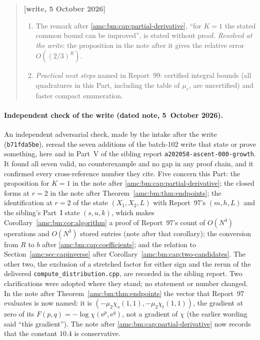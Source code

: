 \documentclass[11pt,letterpaper]{article}
\theoremstyle{remark}\newtheorem{remark}[theorem]{Remark}
\newcommand{\ee}{\mathrm e}
\newenvironment{writenotedated}[1]{\par\smallskip\begin{quote}\small\textbf{[write, #1]}\ }{\end{quote}\smallskip}
\newcommand{\repopath}[1]{\nolinkurl{#1}}
\begin{document}
\begin{writenotedated}{5 October 2026}
\begin{enumerate}
\item The remark after \eqref{amc:bm:cap:partial-derivative}, ``for $K=1$ the stated common bound can be improved'', is stated without proof. \emph{Resolved at the write}: the proposition in the note after it gives the relative error $O((2/3)^R)$.
\item \emph{Practical next steps} named in Report~99: certified integral bounds (all quadratures in this Part, including the table of $\mu_r$, are uncertified) and faster compact enumeration.
\end{enumerate}
\end{writenotedated}

\paragraph{Independent check of the write (dated note, 5~October 2026).}
An independent adversarial check, made by the intake after the write
(\texttt{b71fda5be}), reread the seven additions of the batch-102 write
that state or prove something, here and in Part~V of the sibling report
\repopath{a202058-ascent-000-growth}. It found all seven valid, no
counterexample and no gap in any proof chain, and it confirmed every
cross-reference number they cite. Five concern this Part: the proposition
for $K=1$ in the note after \eqref{amc:bm:cap:partial-derivative}; the
closed forms at $r=2$ in the note after
Theorem~\ref{amc:bm:thm:endpoints}; the identification at $r=2$ of the
state $(X_1,X_2,L)$ with Report~97's $(m,h,L)$ and the sibling's Part~I
state $(s,u,k)$, which makes Corollary~\ref{amc:bm:cor:algorithm} a proof
of Report~97's count of $O(N^4)$ operations and $O(N^3)$ stored entries
(note after that corollary); the conversion from $R$ to $b$ after
\eqref{amc:bm:cap:coefficients}; and the relation to
Section~\ref{amc:sec:capinverse} after
Corollary~\ref{amc:bm:cap:two-candidates}. The other two, the exclusion of
a stretched factor for either sign and the rerun of the delivered
\texttt{compute\_distribution.cpp}, are recorded in the sibling report.
Two clarifications were adopted where they stand; no statement or number
changed. In the note after Theorem~\ref{amc:bm:thm:endpoints} the vector
that Report~97 evaluates is now named: it is
$(-\mu_2\chi_s(1,1),-\mu_2\chi_t(1,1))$, the gradient at zero of its
$F(p,q)=-\log\chi(\ee^p,\ee^q)$, not a gradient of $\chi$ (the earlier
wording said ``this gradient''). The note after
\eqref{amc:bm:cap:partial-derivative} now records that the constant $10.4$
is conservative.
\end{document}
